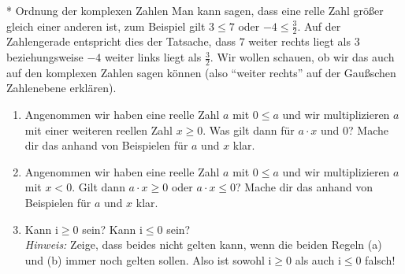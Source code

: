 \documentclass{zirkelblatt1415}
\newcommand{\ii}{\mathrm{i}}
\begin{document}
\begin{aufgabe}{* Ordnung der komplexen Zahlen}
 Man kann sagen, dass eine relle Zahl größer gleich einer anderen ist, zum Beispiel gilt $3\leq 7$ oder $-4\leq \frac{3}{2}$. Auf der Zahlengerade entspricht dies der Tatsache, dass $7$ weiter rechts liegt als $3$ beziehungsweise $-4$ weiter links liegt als $\frac{3}{2}$. Wir wollen schauen, ob wir das auch auf den komplexen Zahlen sagen können (also "`weiter rechts"' auf der Gaußschen Zahlenebene erklären).
 \begin{enumerate}
   \item Angenommen wir haben eine reelle Zahl $a$ mit $0\leq a$ und wir multiplizieren $a$ mit einer weiteren reellen Zahl $x\geq 0$. Was gilt dann für $a\cdot x$ und $0$? Mache dir das anhand von Beispielen für $a$ und $x$ klar.
   \item Angenommen wir haben eine reelle Zahl $a$ mit $0\leq a$ und wir multiplizieren $a$ mit $x< 0$. Gilt dann $a\cdot x\geq 0$ oder $a\cdot x \leq 0$? Mache dir das anhand von Beispielen für $a$ und $x$ klar.
   \item Kann $\ii \geq 0$ sein? Kann $\ii \leq 0$ sein? \\
	\emph{Hinweis:} Zeige, dass beides nicht gelten kann, wenn die beiden Regeln (a) und (b) immer noch gelten sollen. Also ist sowohl $\ii\geq 0$ als auch $\ii\leq 0$ falsch!
 \end{enumerate}
\end{aufgabe}

\end{document}
